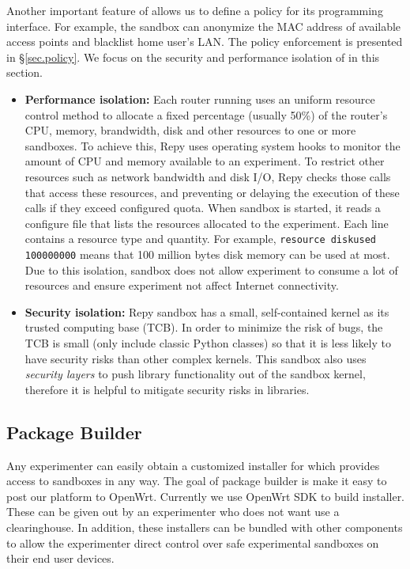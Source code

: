 Another important feature of \sandboxname allows us to define a policy for its programming interface. For example, the sandbox can anonymize the MAC address of available access points and blacklist home user's LAN. The policy enforcement is presented in \S{\ref{sec.policy}}. We focus on the security and performance isolation of \sandboxname in this section.
\begin{itemize}
\item \textbf{Performance isolation: }Each router running \sysname uses an uniform resource control method to allocate a fixed percentage (usually 50\%) of the router's CPU, memory, brandwidth, disk and other resources to one or more sandboxes. To achieve this, Repy uses operating system hooks to monitor the amount of CPU and memory available to an experiment. To restrict other resources such as network bandwidth and disk I/O, Repy checks those calls that access these resources, and preventing or delaying the execution of these calls if they exceed configured quota. When sandbox is started, it reads a configure file that lists the resources allocated to the experiment. Each line contains a resource type and quantity. For example, \texttt{resource diskused 100000000} means that 100 million bytes disk memory can be used at most. Due to this isolation, sandbox does not allow experiment to consume a lot of resources and ensure experiment not affect Internet connectivity.

\item \textbf{Security isolation: }Repy sandbox has a small, self-contained kernel as its trusted computing base (TCB). In order to minimize the risk of bugs, the TCB is small (only include classic Python classes) so that it is less likely to have security risks than other complex kernels. This sandbox also uses \textit{security layers} to push library functionality out of the sandbox kernel, therefore it is helpful to mitigate security risks in libraries. 

\end{itemize}
\subsection{Package Builder}
\label{sec.packagebuilder}
Any experimenter can easily obtain a customized installer for \sysname which provides access to sandboxes in any way. The goal of package builder is make it easy to post our platform to OpenWrt. Currently we use OpenWrt SDK to build installer. These can be given out by an experimenter who does not want use a clearinghouse. In addition, these installers can be bundled with other components to allow the experimenter direct control over safe experimental sandboxes on their end user devices.

